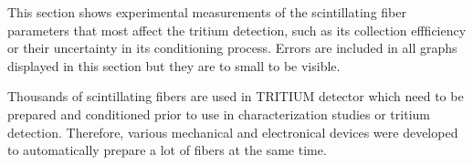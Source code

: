 This section shows experimental measurements of the scintillating fiber parameters that most affect the tritium detection, such as its collection effficiency or their uncertainty in its conditioning process. Errors are included in all graphs displayed in this section but they are to small to be visible.

Thousands of scintillating fibers are used in TRITIUM detector which need to be prepared and conditioned prior to use in characterization studies or tritium detection. Therefore, various mechanical and electronical devices were developed to automatically prepare a lot of fibers at the same time.